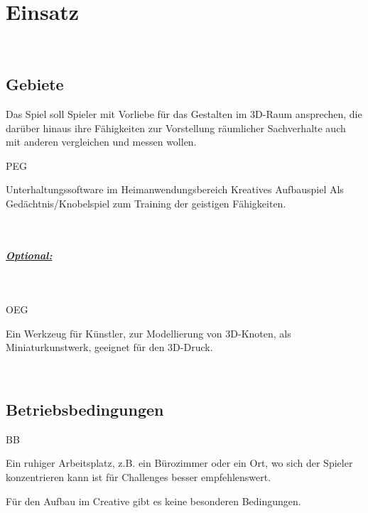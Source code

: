 %
%


\chapter{Einsatz}
\label{ES}~\\


\section{Gebiete}
\label{ES:Gebiete}

Das Spiel soll Spieler mit Vorliebe für das Gestalten im 3D-Raum ansprechen, die darüber hinaus ihre Fähigkeiten zur Vorstellung räumlicher Sachverhalte auch mit anderen vergleichen und messen wollen.\\


\begin{ids}{\gls{PEG}}

	\id[10] Unterhaltungssoftware im Heimanwendungsbereich
	\id[20] Kreatives Aufbauspiel
	\id[30] Als Gedächtnis/Knobelspiel zum Training der geistigen Fähigkeiten.

\end{ids}

~\\


\paragraph*{\underline{Optional:}}~\\

\begin{ids}{\gls{OEG}}

	\id[10] Ein Werkzeug für Künstler, zur Modellierung von 3D-Knoten, als Miniaturkunstwerk, geeignet für den 3D-Druck.

\end{ids}


%
%
~\\

\section{Betriebsbedingungen}
\label{ES:BB}

\begin{ids}{\gls{BB}}

	\id[10] Ein ruhiger Arbeitsplatz, z.B. ein Bürozimmer oder ein Ort, wo sich der Spieler konzentrieren kann ist für Challenges besser empfehlenswert.
	
	\id[20] Für den Aufbau im Creative gibt es keine besonderen Bedingungen.

\end{ids}



